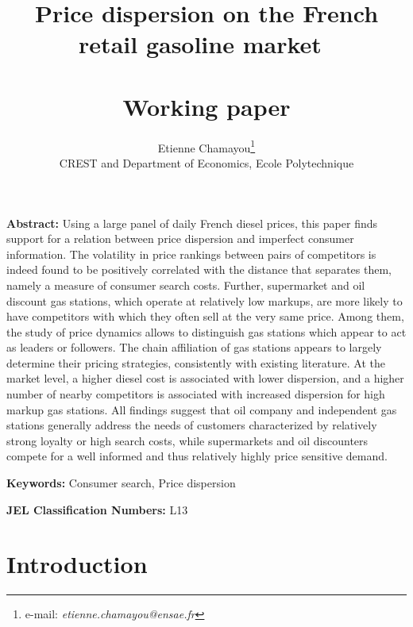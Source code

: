 \documentclass[english]{article}
\begin{document}
\title{Price dispersion on the French retail gasoline market\ \\ \ \\Working paper}
\author{Etienne Chamayou\thanks{e-mail:
\textit{etienne.chamayou@ensae.fr}}\medskip\\{\normalsize CREST and Department of Economics, Ecole Polytechnique }}
\maketitle

\sloppy%

\onehalfspacing

\textbf{Abstract:}
Using a large panel of daily French diesel prices, this paper finds support for a relation between price dispersion and imperfect consumer information. The volatility in price rankings between pairs of competitors is indeed found to be positively correlated with the distance that separates them, namely a measure of consumer search costs. Further, supermarket and oil discount gas stations, which operate at relatively low markups, are more likely to have competitors with which they often sell at the very same price. Among them, the study of price dynamics allows to distinguish gas stations which appear to act as leaders or followers. The chain affiliation of gas stations appears to largely determine their pricing strategies, consistently with existing literature. At the market level, a higher diesel cost is associated with lower dispersion, and a higher number of nearby competitors is associated with increased dispersion for high markup gas stations. All findings suggest that oil company and independent gas stations generally address the needs of customers characterized by relatively strong loyalty or high search costs, while supermarkets and oil discounters compete for a well informed and thus relatively highly price sensitive demand.

\strut

\textbf{Keywords:} Consumer search, Price dispersion

\strut

\textbf{JEL Classification Numbers:} L13

\pagebreak%

\section{Introduction}
\end{document}
